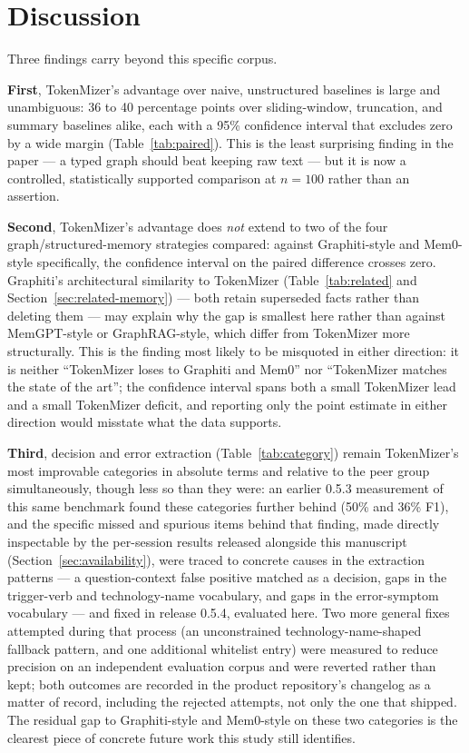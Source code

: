 \documentclass[journal]{IEEEtran}
\begin{document}
\section{Discussion}
\label{sec:discussion}

Three findings carry beyond this specific corpus.

\textbf{First}, TokenMizer's advantage over naive, unstructured
baselines is large and unambiguous: 36 to 40 percentage points
over sliding-window, truncation, and summary baselines alike,
each with a 95\% confidence interval that excludes zero by a
wide margin (Table~\ref{tab:paired}). This is the least
surprising finding in the paper --- a typed graph should beat
keeping raw text --- but it is now a controlled, statistically
supported comparison at $n=100$ rather than an assertion.

\textbf{Second}, TokenMizer's advantage does \emph{not} extend
to two of the four graph/structured-memory strategies compared:
against Graphiti-style and Mem0-style specifically, the
confidence interval on the paired difference crosses zero.
Graphiti's architectural similarity to TokenMizer
(Table~\ref{tab:related} and Section~\ref{sec:related-memory})
--- both retain superseded facts rather than deleting them ---
may explain why the gap is smallest here rather than against
MemGPT-style or GraphRAG-style, which differ from TokenMizer
more structurally. This is the finding most likely to be
misquoted in either direction: it is neither ``TokenMizer loses
to Graphiti and Mem0'' nor ``TokenMizer matches the state of
the art''; the confidence interval spans both a small TokenMizer
lead and a small TokenMizer deficit, and reporting only the
point estimate in either direction would misstate what the data
supports.

\textbf{Third}, decision and error extraction
(Table~\ref{tab:category}) remain TokenMizer's most improvable
categories in absolute terms and relative to the peer group
simultaneously, though less so than they were: an earlier
0.5.3 measurement of this same benchmark found these categories
further behind (50\% and 36\% F1), and the specific missed and
spurious items behind that finding, made directly inspectable by
the per-session results released alongside this manuscript
(Section~\ref{sec:availability}), were traced to concrete causes
in the extraction patterns --- a question-context false positive
matched as a decision, gaps in the trigger-verb and
technology-name vocabulary, and gaps in the error-symptom
vocabulary --- and fixed in release 0.5.4, evaluated here. Two
more general fixes attempted during that process (an
unconstrained technology-name-shaped fallback pattern, and one
additional whitelist entry) were measured to reduce precision on
an independent evaluation corpus and were reverted rather than
kept; both outcomes are recorded in the product repository's
changelog as a matter of record, including the rejected attempts,
not only the one that shipped. The residual gap to Graphiti-style
and Mem0-style on these two categories is the clearest piece of
concrete future work this study still identifies.
\end{document}
